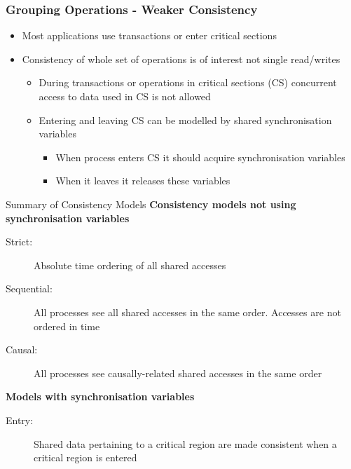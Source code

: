 \subsubsection{Grouping Operations - Weaker Consistency}
\begin{itemize}
	\item Most applications use transactions or enter critical sections
	\item Consistency of whole set of operations is of interest not single read/writes
	\begin{itemize}
		\item During transactions or operations in critical sections (CS) concurrent access to data used in CS is not allowed
		\item Entering and leaving CS can be modelled by shared synchronisation variables
		\begin{itemize}
			\item When process enters CS it should acquire synchronisation variables
			\item When it leaves it releases these variables
		\end{itemize}
	\end{itemize}
\end{itemize}

\begin{note}{Summary of Consistency Models}
\textbf{Consistency models not using synchronisation variables}
\begin{description}
	\item[Strict:] Absolute time ordering of all shared accesses
	\item[Sequential:] All processes see all shared accesses in the same order. Accesses are not ordered in time
	\item[Causal:] All processes see causally-related shared accesses in the same order
\end{description}
\textbf{Models with synchronisation variables}
\begin{description}
	\item[Entry:] Shared data pertaining to a critical region are made consistent when a critical region is entered
\end{description}
\end{note}

